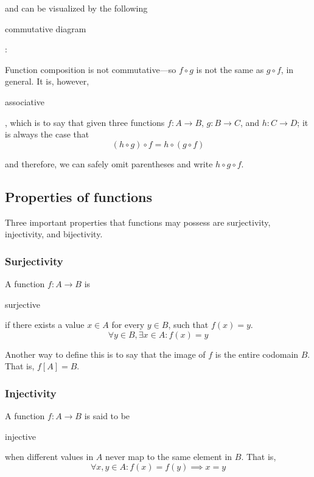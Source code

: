 \documentclass[11pt]{article}
\theoremstyle{plain}
\theoremstyle{definition}
\begin{document}
\noindent and can be visualized by the following \begin{em}commutative diagram\end{em}:

\begin{center}
  \def\svgwidth{0.2\columnwidth}
  
\end{center}

\noindent Function composition is not commutative---so $ f \circ g $ is not the same as $ g \circ f $, in general.
It is, however, \begin{em}associative\end{em}, which is to say that given three functions \mbox{$ f : A \to B $}, \mbox{$ g : B \to C $}, and \mbox{$ h : C \to D $}; it is always the case that
$$ 
  (h \circ g) \circ f = h \circ (g \circ f)
$$

\noindent and therefore, we can safely omit parentheses and write $ h \circ g \circ f $.

\begin{center}
  \def\svgwidth{0.3\columnwidth}
  
\end{center}

\subsection*{Properties of functions}

Three important properties that functions may possess are surjectivity, injectivity, and bijectivity.

\subsubsection*{ Surjectivity}

A function $ f : A \to B $ is \begin{em}surjective\end{em} if there exists a value $ x \in A $ for every $ y \in B $, such that $ f(x) = y $. 
$$
  \forall y \in B, \exists x \in A : f(x) = y
$$

\noindent Another way to define this is to say that the image of $ f $ is the entire codomain $ B $. That is, $ f[A] = B $.

\subsubsection*{ Injectivity}

A function $ f : A \to B $ is said to be \begin{em}injective\end{em} when different values in $ A $ never map to the same element in $ B $. That is,
$$
  \forall x, y \in A : f(x) = f(y) \implies x = y
$$
\end{document}
